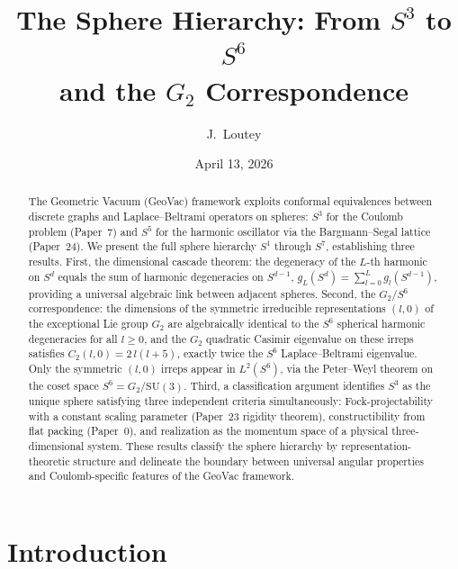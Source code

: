 \documentclass[twocolumn,pra,amsmath,amssymb,superscriptaddress]{revtex4-2}
\begin{document}
\title{The Sphere Hierarchy: From $S^3$ to $S^6$\\
and the $G_2$ Correspondence}

\author{J.~Loutey}

\date{April 13, 2026}

\begin{abstract}
The Geometric Vacuum (GeoVac) framework exploits conformal
equivalences between discrete graphs and Laplace--Beltrami operators
on spheres: $S^3$ for the Coulomb problem (Paper~7) and $S^5$ for
the harmonic oscillator via the Bargmann--Segal lattice (Paper~24).
We present the full sphere hierarchy $S^1$ through $S^7$,
establishing three results.
First, the dimensional cascade theorem: the degeneracy of the $L$-th
harmonic on $S^d$ equals the sum of harmonic degeneracies on $S^{d-1}$,
$g_L(S^d) = \sum_{l=0}^{L} g_l(S^{d-1})$, providing a universal
algebraic link between adjacent spheres.
Second, the $G_2/S^6$ correspondence: the dimensions of the
symmetric irreducible representations $(l,0)$ of the exceptional Lie
group $G_2$ are algebraically identical to the $S^6$ spherical
harmonic degeneracies for all $l \geq 0$, and the $G_2$ quadratic
Casimir eigenvalue on these irreps satisfies
$C_2(l,0) = 2\,l(l+5)$, exactly twice the $S^6$ Laplace--Beltrami
eigenvalue.  Only the symmetric $(l,0)$ irreps appear in $L^2(S^6)$,
via the Peter--Weyl theorem on the coset space $S^6 = G_2/\mathrm{SU}(3)$.
Third, a classification argument identifies $S^3$ as the unique
sphere satisfying three independent criteria simultaneously:
Fock-projectability with a constant scaling parameter (Paper~23
rigidity theorem), constructibility from flat packing (Paper~0),
and realization as the momentum space of a physical
three-dimensional system.  These results classify the sphere
hierarchy by representation-theoretic structure and delineate the
boundary between universal angular properties and Coulomb-specific
features of the GeoVac framework.
\end{abstract}

\maketitle

\section{Introduction}
\label{sec:intro}
\end{document}
